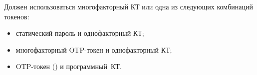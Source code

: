 Должен использоваться многофакторный  КТ или одна из 
следующих комбинаций токенов:
\begin{itemize}
\item
статический пароль и однофакторный  КТ;
\item
многофакторный OTP-токен и однофакторный  КТ;
\item
{} OTP-токен ()
и программный~КТ.
\end{itemize}



